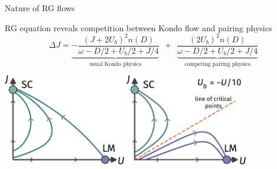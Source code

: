 \documentclass[9pt,aspectratio=169]{beamer}
\begin{document}
\begin{frame}{Nature of RG flows}

\begin{itemize}
	\nitem RG equation reveals competition between Kondo flow and pairing physics
	\[\Delta J = \underbrace{-\frac{(J + 2U_b)^2 n(D)}{\omega - D/2 + U_b/2 + J/4}}_\text{usual Kondo physics} ~ ~ + ~ ~\underbrace{\frac{(2U_b)^2 n(D)}{\omega - D/2 + U_b/2 + J/4}}_\text{competing pairing physics}\]
\end{itemize}

\vspace*{\fill}

\includegraphics[width=0.4\textwidth]{rg-flows1.pdf}
\hspace*{\fill}
\includegraphics[width=0.4\textwidth]{rg-flows2.pdf}

\end{frame}
\end{document}

